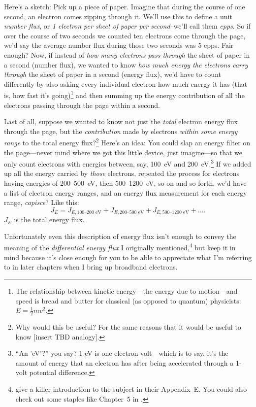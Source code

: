 Here's a sketch: Pick up a piece of paper. Imagine that during the
course of one second, an electron comes zipping through it. We'll use
this to define a unit \emph{number flux}, or \emph {1 electron per
  sheet of paper per second}--we'll call them \emph{epps}. So if over
the course of two seconds we counted ten electrons come through the
page, we'd say the average number flux during those two seconds was 5
epps. Fair enough?  Now, if instead of \emph{how many electrons pass
  through} the sheet of paper in a second (number flux), we wanted to
know \emph{how much energy the electrons carry through} the sheet of
paper in a second (energy flux), we'd have to count differently by
also asking every individual electron how much energy it has (that is,
how fast it's going)\footnote{The relationship between kinetic
  energy---the energy due to motion---and speed is bread and butter
  for classical (as opposed to quantum) physicists: $E = \frac{1}{2}m
  v^2.$} and then summing up the energy contribution of all the
electrons passing through the page within a second.

Last of all, suppose we wanted to know not just the \emph{total}
electron energy flux through the page, but the \emph{contribution}
made by electrons \emph{within some energy range} to the total energy
flux?\footnote{Why would this be useful?  For the same reasons that it
  would be useful to know [insert TBD analogy].}  Here's an idea: You
could slap an energy filter on the page---never mind where we got this
little device, just imagine---so that we only count electrons with
energies between, say, 100~eV and 200~eV.\footnote{``An 'eV'?''  you
  say? 1 eV is one electron-volt---which is to say, it's the amount of
  energy that an electron has after being accelerated through a 1-volt
  potential difference.} If we added up all the energy carried by
\emph{those} electrons, repeated the process for electrons having
energies of 200--500~eV, then 500--1200~eV, so on and so forth, we'd
have a list of electron energy ranges, and an energy flux measurement
for each energy range, \emph{capisce}? Like this:
\begin{equation}
  \label{ch1:eqeFlux}
  J_{E} = J_{E,\textrm{100--200 eV}} + J_{E,\textrm{200--500 eV}} + J_{E,\textrm{500--1200 eV}} + \dots .
\end{equation}
$J_E$ is the total energy flux.

Unfortunately even this description of energy flux isn't enough to
convey the meaning of the \emph{differential energy flux} I originally
mentioned,\footnote{\citet{Bruno2013} give a killer introduction to
  the subject in their Appendix~E. You could also check out some
  staples like Chapter~5 in \citet{Paschmann1998}.} but keep it in mind
because it's close enough for you to be able to appreciate what I'm
referring to in later chapters when I bring up broadband electrons.

